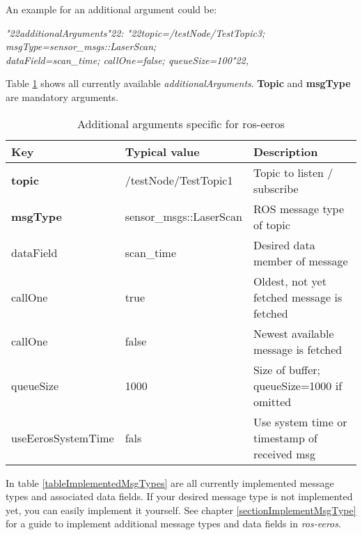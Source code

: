 An example for an additional argument could be:

\begin{snugshade*}
\textit{\char"22additionalArguments\char"22: \char"22topic=/testNode/TestTopic3; msgType=sensor\_msgs::LaserScan; \\
dataField=scan\_time; callOne=false; queueSize=100\char"22,}
\end{snugshade*}


Table \ref{tableAdditionalArgumentsEeros} shows all currently available \textit{additionalArguments}.
\textbf{Topic} and \textbf{msgType} are mandatory arguments.

\begin{table}
\centering
\caption{Additional arguments specific for ros-eeros}
\label{tableAdditionalArgumentsEeros}
\begin{tabular}{@{}lll@{}}
\toprule
Key        & Typical value           & Description                                \\ \midrule
\textbf{topic}      & /testNode/TestTopic1    & Topic to listen / subscribe                \\
\textbf{msgType }   & sensor\_msgs::LaserScan & ROS message type of topic                  \\ 
dataField & scan\_time              & Desired data member of message             \\
callOne    & true                    & Oldest, not yet fetched message is fetched \\
callOne    & false                   & Newest available message is fetched        \\
queueSize  & 1000                    & Size of buffer; queueSize=1000 if omitted  \\ 
useEerosSystemTime  & fals           & Use system time or timestamp of received msg  \\ \bottomrule
\end{tabular}
\end{table}

In table \ref{tableImplementedMsgTypes} are all currently implemented message types and associated data fields.
If your desired message type is not implemented yet, you can easily implement it yourself.
See chapter \ref{sectionImplementMsgType} for a guide to implement additional message types and data fields in \textit{ros-eeros}.

